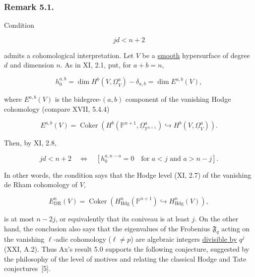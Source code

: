 \subsubsection*{Remark 5.1.}
Condition

\begin{equation}\tag{5.1.1}
jd<n+2
\end{equation}

admits a cohomological interpretation.  Let $V$ be a \underline{smooth} hypersurface of
degree $d$ and dimension $n$.  As in XI, 2.1, put, for $a+b=n$,

\begin{equation}\tag{5.1.2}
h_0^{a,b}
=\dim H^b(V,\underline{\Omega}_V^a)-\delta_{a,b}
=\dim E^{a,b}(V),
\end{equation}

where $E^{a,b}(V)$ is the bidegree-$(a,b)$ component of the vanishing Hodge
cohomology (compare XVII, 5.4.4)

\begin{equation}\tag{5.1.3}
E^{a,b}(V)
=\operatorname{Coker}\!\left(
H^b(\mathbb P^{n+1},\underline{\Omega}_{\mathbb P^{n+1}}^a)
\hookrightarrow H^b(V,\underline{\Omega}_V^a)\right).
\end{equation}

Then, by XI, 2.8,

\begin{equation}\tag{5.1.4}
jd<n+2
\quad\Longleftrightarrow\quad
\left[h_0^{a,n-a}=0\quad\text{for }a<j\text{ and }a>n-j\right].
\end{equation}

In other words, the condition says that the Hodge level (XI, 2.7) of the
vanishing de Rham cohomology of $V$,

\[
E_{\mathrm{DR}}^n(V)
=\operatorname{Coker}\!\left(
H_{\mathrm{Hdg}}^n(\mathbb P^{n+1})
\hookrightarrow H_{\mathrm{Hdg}}^n(V)\right),
\]

is at most $n-2j$, or equivalently that its coniveau is at least $j$.
On the other hand, the conclusion also says that the eigenvalues of the
Frobenius $\mathfrak F_q$ acting on the vanishing $\ell$-adic cohomology
($\ell\ne p$) are algebraic integers \underline{divisible by} $q^j$ (XXI, A.2).
Thus Ax's result 5.0 supports the following conjecture, suggested by the
philosophy of the level of motives and relating the classical Hodge and
Tate conjectures~[5].

